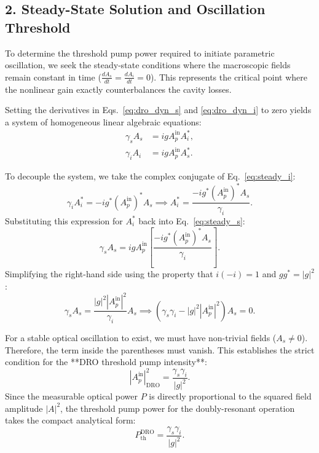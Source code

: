 \begin{resolucao}[Solution]
    \subsection*{2. Steady-State Solution and Oscillation Threshold}

    To determine the threshold pump power required to initiate parametric oscillation, we seek the steady-state conditions where the macroscopic fields remain constant in time ($ \frac{dA_s}{dt} = \frac{dA_i}{dt} = 0 $). This represents the critical point where the nonlinear gain exactly counterbalances the cavity losses.

    Setting the derivatives in Eqs.~\eqref{eq:dro_dyn_s} and \eqref{eq:dro_dyn_i} to zero yields a system of homogeneous linear algebraic equations:
    \begin{align}
        \gamma_s A_s &= i g A_p^{\mathrm{in}} A_i^*, \label{eq:steady_s} \\
        \gamma_i A_i &= i g A_p^{\mathrm{in}} A_s^*. \label{eq:steady_i}
    \end{align}
    
    To decouple the system, we take the complex conjugate of Eq.~\eqref{eq:steady_i}:
    \begin{equation}
        \gamma_i A_i^* = -i g^* (A_p^{\mathrm{in}})^* A_s \implies A_i^* = \frac{-i g^* (A_p^{\mathrm{in}})^* A_s}{\gamma_i}.
    \end{equation}
    Substituting this expression for $A_i^*$ back into Eq.~\eqref{eq:steady_s}:
    \begin{equation}
        \gamma_s A_s = i g A_p^{\mathrm{in}} \left[ \frac{-i g^* (A_p^{\mathrm{in}})^* A_s}{\gamma_i} \right].
    \end{equation}
    Simplifying the right-hand side using the property that $i(-i) = 1$ and $g g^* = |g|^2$:
    \begin{equation}
        \gamma_s A_s = \frac{|g|^2 |A_p^{\mathrm{in}}|^2}{\gamma_i} A_s \implies \left( \gamma_s \gamma_i - |g|^2 |A_p^{\mathrm{in}}|^2 \right) A_s = 0.
    \end{equation}

    For a stable optical oscillation to exist, we must have non-trivial fields ($A_s \neq 0$). Therefore, the term inside the parentheses must vanish. This establishes the strict condition for the **DRO threshold pump intensity**:
    \begin{equation}
        |A_p^{\mathrm{in}}|^2_{\mathrm{DRO}} = \frac{\gamma_s \gamma_i}{|g|^2}.
    \end{equation}
    Since the measurable optical power $P$ is directly proportional to the squared field amplitude $|A|^2$, the threshold pump power for the doubly-resonant operation takes the compact analytical form:
    \begin{equation}
        \boxed{P_{\mathrm{th}}^{\mathrm{DRO}} = \frac{\gamma_s \gamma_i}{|g|^2}}.
        \label{eq:threshold_dro}
    \end{equation}


\end{resolucao}
